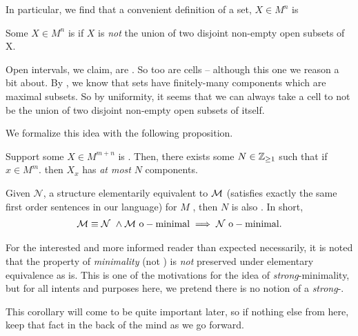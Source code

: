 In particular, we find that a convenient definition of a  set, $X \in M^n$ is

\begin{definition}
  Some $X \in M^n$ is  if $X$ is \emph{not} the union of two disjoint non-empty  open subsets of X.
\end{definition}


\begin{example}
  Open intervals, we claim, are . So too are cells -- although this one we reason a bit about. By \CD, we know that  sets have finitely-many  components which are maximal  \cnctd subsets. So by uniformity, it seems that we can always take a cell to not be the union of two disjoint non-empty  open subsets of itself.

\end{example}

We formalize this idea with the following proposition.

\begin{proposition}
  \label{prop:dfnblycnctd}
  Support some $X \in M^{m + n}$ is . Then, there exists some $N \in \mathbb{Z}_{\geq 1}$ such that if $x \in M^m$. then $X_x$ has \emph{at most} $N$  components.
\end{proposition}

\begin{corollary}
  Given $\mathcal{N}$, a structure elementarily equivalent to $\mathcal{M}$ (satisfies exactly the same first order sentences in our language) for $M$ \om, then $N$ is also \om. In short,
  \begin{align*}
    \mathcal{M} \equiv \mathcal{N} \ \wedge \mathcal{M} \ \mathrm{o-minimal} \implies \mathcal{N} \ \mathrm{o-minimal}.
  \end{align*}
\end{corollary}

\begin{svgraybox}
  For the interested and more informed reader than expected necessarily, it is noted that the property of \emph{minimality} (not \om) is \emph{not} preserved under elementary equivalence as \om is. This is one of the motivations for the idea of \emph{strong}-minimality, but for all intents and purposes here, we pretend there is no notion of a \emph{strong}-\om.
\end{svgraybox}

This corollary will come to be quite important later, so if nothing else from here, keep that fact in the back of the mind as we go forward.

